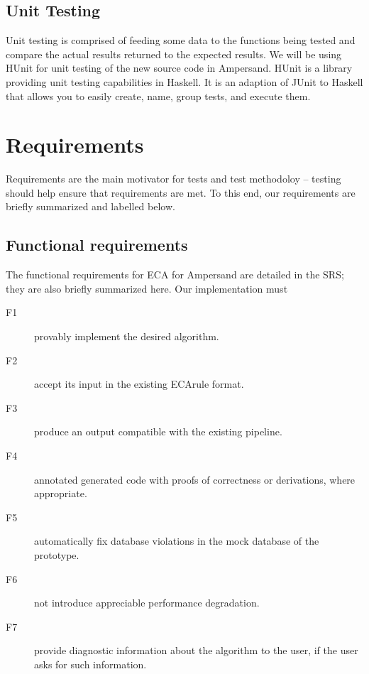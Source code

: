 \documentclass[12pt]{report}
\begin{document}


\subsection{Unit Testing}\label{subsec:UnitTest}
Unit testing is comprised of feeding some data to the functions being tested and
compare the actual results returned to the expected results.
We will be using HUnit for unit testing of the new source code 
in Ampersand. HUnit is a 
library providing unit testing capabilities in Haskell.  It is an adaption of 
JUnit to Haskell that allows you to easily create, name, group tests, and 
execute them.

\section{Requirements}\label{sec:Reqs}
Requirements are the main motivator for tests and test methodoloy -- testing
should help ensure that requirements are met. To this end, our requirements are
briefly summarized and labelled below.

\subsection{Functional requirements}\label{subsec:FunReqs}
The functional requirements for ECA for Ampersand are detailed in the SRS; they
are also briefly summarized here. Our implementation must

\begin{description}
\item[F1] provably implement the desired algorithm.
\item[F2] accept its input in the existing ECArule format.
\item[F3] produce an output compatible with the existing pipeline. 
\item[F4] annotated generated code with proofs of correctness or derivations,
where appropriate. 
\item[F5] automatically fix database violations in the mock database of the
prototype.
\item[F6] not introduce appreciable performance degradation. 
\item[F7] provide diagnostic information about the algorithm to
the user, if the user asks for such information.
\end{description}
\end{document}
